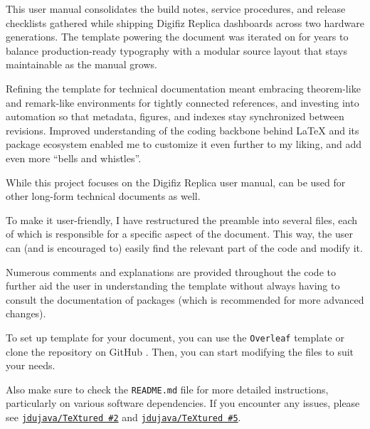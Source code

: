  \label{ch:Introduction}

This user manual consolidates the build notes, service procedures, and release checklists gathered while shipping Digifiz Replica dashboards across two hardware generations.
The \TeXtured{} template powering the document was iterated on for years to balance production-ready typography with a modular source layout that stays maintainable as the manual grows.

Refining the template for technical documentation meant embracing theorem-like and remark-like environments for tightly connected references, and investing into automation so that metadata, figures, and indexes stay synchronized between revisions.
Improved understanding of the coding backbone behind \LaTeX{} and its package ecosystem enabled me to customize it even further to my liking, and add even more \enquote{bells and whistles}.

\begin{remark}
    While this project focuses on the Digifiz Replica user manual, \TeXtured{} can be used for other long-form technical documents as well.
\end{remark}

To make it user-friendly, I have restructured the preamble into several files, each of which is responsible for a specific aspect of the document.
This way, the user can (and is encouraged to) easily find the relevant part of the code and modify it.

Numerous comments and explanations are provided throughout the code to further aid the user in understanding the template without always having to consult the documentation of packages (which is recommended for more advanced changes).

\begin{remark}
    To set up \TeXtured{} template for your document, you can use the \texttt{Overleaf} template or clone the repository on \textsf{GitHub} \autocite{TeXtured}.
    Then, you can start modifying the files to suit your needs.

    Also make sure to check the \texttt{README.md} file for more detailed instructions, particularly on various software dependencies.
    If you encounter any issues, please see \href{https://github.com/jdujava/TeXtured/issues/2}{\texttt{jdujava/TeXtured \#2}} and \href{https://github.com/jdujava/TeXtured/issues/5}{\texttt{jdujava/TeXtured \#5}}.
\end{remark}
